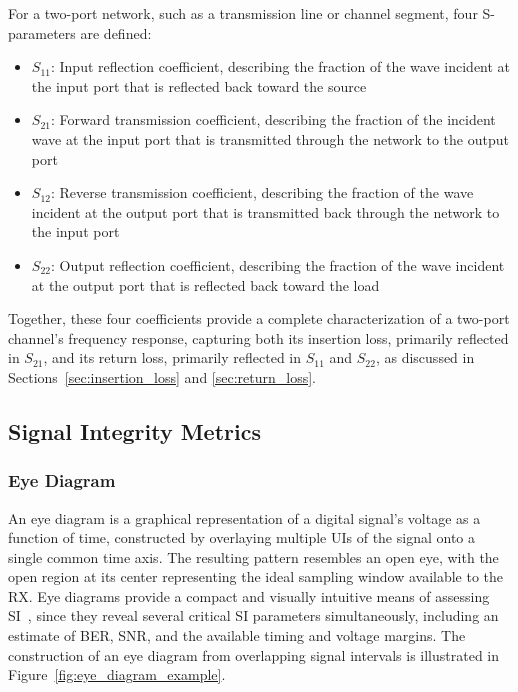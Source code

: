 For a two-port network, such as a transmission line or channel segment, four S-parameters are defined: 

\begin{itemize}
    \item $S_{11}$: Input reflection coefficient, describing the fraction of the wave incident at the input port that is reflected back toward the source
    \item $S_{21}$: Forward transmission coefficient, describing the fraction of the incident wave at the input port that is transmitted through the network to the output port
    \item $S_{12}$: Reverse transmission coefficient, describing the fraction of the wave incident at the output port that is transmitted back through the network to the input port
    \item $S_{22}$: Output reflection coefficient, describing the fraction of the wave incident at the output port that is reflected back toward the load
\end{itemize}


Together, these four coefficients provide a complete characterization of a two-port channel's frequency response, capturing both its insertion loss, primarily reflected in $S_{21}$, and its return loss, primarily reflected in $S_{11}$ and $S_{22}$, as discussed in Sections~\ref{sec:insertion_loss} and \ref{sec:return_loss}.

\subsection{Signal Integrity Metrics}

\subsubsection{Eye Diagram}\label{sec:eye_diagram}

An eye diagram is a graphical representation of a digital signal's voltage as a function of time, constructed by overlaying multiple \acp{UI} of the signal onto a single common time axis. The resulting pattern resembles an open eye, with the open region at its center representing the ideal sampling window available to the \ac{RX}. Eye diagrams provide a compact and visually intuitive means of assessing \ac{SI}~\cite{bogatin_SI}, since they reveal several critical \ac{SI} parameters simultaneously, including an estimate of \ac{BER}, \ac{SNR}, and the available timing and voltage margins.
The construction of an eye diagram from overlapping signal intervals is illustrated in Figure~\ref{fig:eye_diagram_example}.

